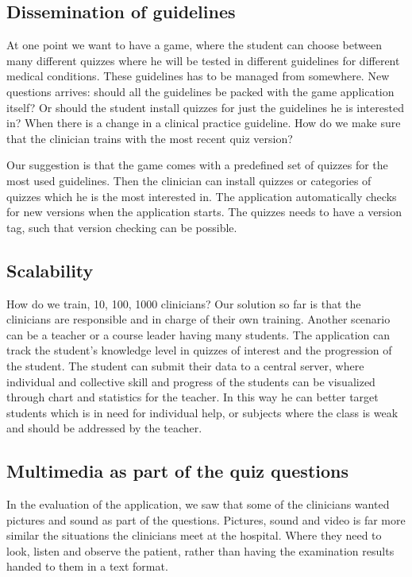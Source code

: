 \subsection{Dissemination of guidelines}
At one point we want to have a game, where the student can choose between many different quizzes where he will be tested in different guidelines for different medical conditions. These guidelines has to be managed from somewhere. New questions arrives: should all the guidelines be packed with the game application itself? Or should the student install quizzes for just the guidelines he is interested in? When there is a change in a clinical practice guideline. How do we make sure that the clinician trains with the most recent quiz version?

Our suggestion is that the game comes with a predefined set of quizzes for the most used guidelines. Then the clinician can install quizzes or categories of quizzes which he is the most interested in. The application automatically checks for new versions when the application starts. The quizzes needs to have a version tag, such that version checking can be possible.

\subsection{Scalability}
How do we train, 10, 100, 1000 clinicians? Our solution so far is that the clinicians are responsible and in charge of their own training. Another scenario can be a teacher or a course leader having many students. The application can track the student's knowledge level in quizzes of interest and the progression of the student. The student can submit their data to a central server, where individual and collective skill and progress of the students can be visualized through chart and statistics for the teacher. In this way he can better target students which is in need for individual help, or subjects where the class is weak and should be addressed by the teacher.

\subsection{Multimedia as part of the quiz questions}
In the evaluation of the application, we saw that some of the clinicians wanted pictures and sound as part of the questions. Pictures, sound and video is far more similar the situations the clinicians meet at the hospital. Where they need to look, listen and observe the patient, rather than having the examination results handed to them in a text format. 

